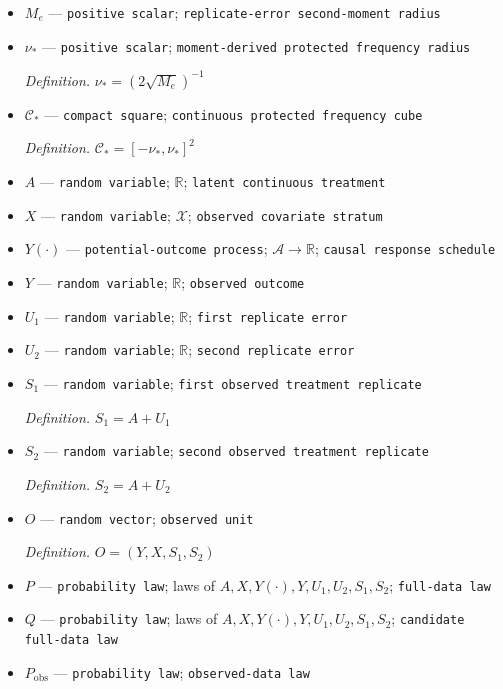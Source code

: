 \documentclass{article}
\begin{document}
\begin{itemize}
  \item \(M_e\) --- \texttt{positive scalar}; \texttt{replicate-\allowbreak{}error second-\allowbreak{}moment radius}
  \item \(\nu_*\) --- \texttt{positive scalar}; \texttt{moment-\allowbreak{}derived protected frequency radius}
  \par\smallskip\noindent\emph{Definition.} \(\nu_*=(2\sqrt{M_e})^{-1}\)
  \item \(\mathcal C_*\) --- \texttt{compact square}; \texttt{continuous protected frequency cube}
  \par\smallskip\noindent\emph{Definition.} \(\mathcal C_*=[-\nu_*,\nu_*]^2\)
  \item \(A\) --- \texttt{random variable}; \(\mathbb R\); \texttt{latent continuous treatment}
  \item \(X\) --- \texttt{random variable}; \(\mathcal X\); \texttt{observed covariate stratum}
  \item \(Y(\cdot)\) --- \texttt{potential-\allowbreak{}outcome process}; \(\mathcal A\to\mathbb R\); \texttt{causal response schedule}
  \item \(Y\) --- \texttt{random variable}; \(\mathbb R\); \texttt{observed outcome}
  \item \(U_1\) --- \texttt{random variable}; \(\mathbb R\); \texttt{first replicate error}
  \item \(U_2\) --- \texttt{random variable}; \(\mathbb R\); \texttt{second replicate error}
  \item \(S_1\) --- \texttt{random variable}; \texttt{first observed treatment replicate}
  \par\smallskip\noindent\emph{Definition.} \(S_1=A+U_1\)
  \item \(S_2\) --- \texttt{random variable}; \texttt{second observed treatment replicate}
  \par\smallskip\noindent\emph{Definition.} \(S_2=A+U_2\)
  \item \(O\) --- \texttt{random vector}; \texttt{observed unit}
  \par\smallskip\noindent\emph{Definition.} \(O=(Y,X,S_1,S_2)\)
  \item \(P\) --- \texttt{probability law}; laws of \(A,X,Y(\cdot),Y,U_1,U_2,S_1,S_2\); \texttt{full-\allowbreak{}data law}
  \item \(Q\) --- \texttt{probability law}; laws of \(A,X,Y(\cdot),Y,U_1,U_2,S_1,S_2\); \texttt{candidate full-\allowbreak{}data law}
  \item \(P_{\mathrm{obs}}\) --- \texttt{probability law}; \texttt{observed-\allowbreak{}data law}

\end{itemize}
\end{document}
